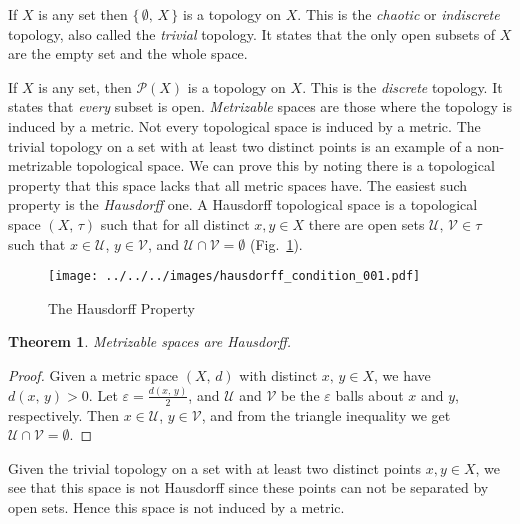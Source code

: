 \documentclass{article}
\theoremstyle{plain}
\newtheorem{theorem}{Theorem}[section]
\theoremstyle{normal}
\newenvironment{example}{%
    \pushQED{\qed}\renewcommand{\qedsymbol}{$\blacksquare$}\examplex%
}{%
    \popQED\endexamplex%
}
\newenvironment{definition}{%
    \pushQED{\qed}\renewcommand{\qedsymbol}{$\blacksquare$}\definitionx%
}{%
    \popQED\enddefinitionx%
}
\begin{document}
        \begin{example}
            If $X$ is any set then $\{\,\emptyset,\,X\,\}$ is a topology on $X$.
            This is the \textit{chaotic} or \textit{indiscrete} topology, also
            called the \textit{trivial} topology. It states that the only open
            subsets of $X$ are the empty set and the whole space.%
        \end{example}
        \begin{example}
            If $X$ is any set, then $\mathcal{P}(X)$ is a topology on $X$.
            This is the \textit{discrete} topology. It states that
            \textit{every} subset is open.
        \end{example}
        \textit{Metrizable}%
        spaces are those where the topology is induced by a
        metric. Not every topological space is induced by a metric. The trivial
        topology on a set with at least two distinct points is an example of a
        non-metrizable topological space. We can prove this by noting there is a
        topological property that this space lacks that all metric spaces have.
        The easiest such property is the \textit{Hausdorff} one.
        \begin{definition}[Hausdorff Topological Space]
            A Hausdorff topological space is a topological space
            $(X,\,\tau)$ such that for all distinct $x,y\in{X}$ there are open
            sets $\mathcal{U},\,\mathcal{V}\in\tau$ such that
            $x\in\mathcal{U}$, $y\in\mathcal{V}$, and
            $\mathcal{U}\cap\mathcal{V}=\emptyset$
            (Fig.~\ref{fig:hausdorff_condition_001}).%
        \end{definition}
        \begin{figure}
            \centering
            \texttt{[image: ../../../images/hausdorff\_condition\_001.pdf]}
            \caption{The Hausdorff Property}
            \label{fig:hausdorff_condition_001}
        \end{figure}
        \begin{theorem}
            Metrizable spaces are Hausdorff.
        \end{theorem}
        \begin{proof}
            Given a metric space $(X,\,d)$ with distinct
            $x,\,y\in{X}$, we have $d(x,\,y)>0$.
            Let $\varepsilon=\frac{d(x,\,y)}{2}$, and
            $\mathcal{U}$ and $\mathcal{V}$ be the $\varepsilon$ balls about
            $x$ and $y$, respectively. Then $x\in\mathcal{U}$,
            $y\in\mathcal{V}$, and from the triangle inequality we get
            $\mathcal{U}\cap\mathcal{V}=\emptyset$.
        \end{proof}
        Given the trivial topology on a set with at least two distinct points
        $x,y\in{X}$, we see that this space is not Hausdorff since these points
        can not be separated by open sets. Hence this space is not induced by
        a metric.
\end{document}
